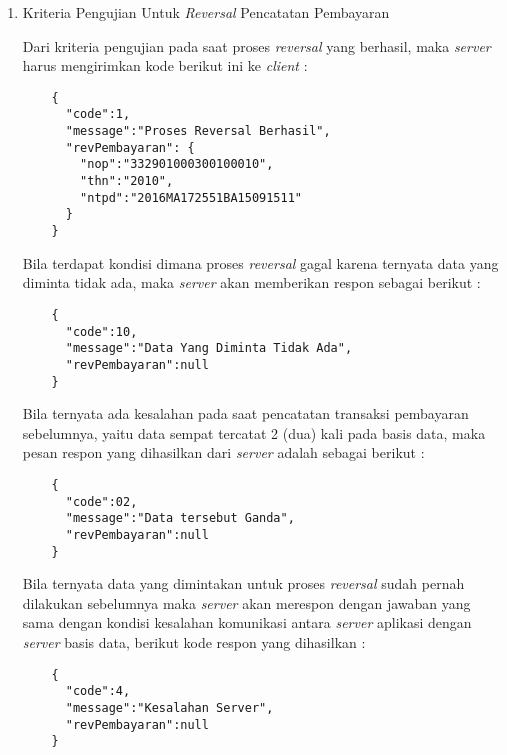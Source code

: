 \documentclass[pdftex,12pt, oneside]{article}
\begin{document}
\begin{enumerate}[1.]
  \item Kriteria Pengujian Untuk \textit{Reversal} Pencatatan Pembayaran
  
  Dari kriteria pengujian pada saat proses \textit{reversal} yang berhasil, maka \textit{server} harus mengirimkan kode berikut ini ke \textit{client} :
  
  \begin{lstlisting}
    {
      "code":1,
      "message":"Proses Reversal Berhasil",
      "revPembayaran": {
        "nop":"332901000300100010",
        "thn":"2010",
        "ntpd":"2016MA172551BA15091511"
      }
    }
  \end{lstlisting}
  
  Bila terdapat kondisi dimana proses \textit{reversal} gagal karena ternyata data yang diminta tidak ada, maka \textit{server} akan memberikan respon sebagai berikut :
  
  \begin{lstlisting}
    {
      "code":10,
      "message":"Data Yang Diminta Tidak Ada",
      "revPembayaran":null
    }
  \end{lstlisting}
  
  Bila ternyata ada kesalahan pada saat pencatatan transaksi pembayaran sebelumnya, yaitu data sempat tercatat 2 (dua) kali pada basis data, maka pesan respon yang dihasilkan dari \textit{server} adalah sebagai berikut :
  
  \begin{lstlisting}
    {
      "code":02,
      "message":"Data tersebut Ganda",
      "revPembayaran":null
    }
  \end{lstlisting}
  
  Bila ternyata data yang dimintakan untuk proses \textit{reversal} sudah pernah dilakukan sebelumnya maka \textit{server} akan merespon dengan jawaban yang sama dengan kondisi kesalahan komunikasi antara \textit{server} aplikasi dengan \textit{server} basis data, berikut kode respon yang dihasilkan :
  
  \begin{lstlisting}
    {
      "code":4,
      "message":"Kesalahan Server",
      "revPembayaran":null
    }
  \end{lstlisting}
  
  \end{enumerate}
\end{document}
